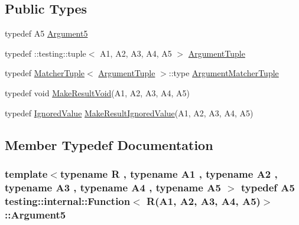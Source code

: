 \subsection*{Public Types}
\begin{DoxyCompactItemize}
\item 
typedef A5 \hyperlink{structtesting_1_1internal_1_1Function_3_01R_07A1_00_01A2_00_01A3_00_01A4_00_01A5_08_4_a5bc0279c43aa98c409219dee1b815c71}{Argument5}
\item 
typedef \+::testing\+::tuple$<$ A1, A2, A3, A4, A5 $>$ \hyperlink{structtesting_1_1internal_1_1Function_3_01R_07A1_00_01A2_00_01A3_00_01A4_00_01A5_08_4_af5a1487829347eae2a48b2f66f216f52}{Argument\+Tuple}
\item 
typedef \hyperlink{structtesting_1_1internal_1_1MatcherTuple}{Matcher\+Tuple}$<$ \hyperlink{structtesting_1_1internal_1_1Function_3_01R_07_08_4_ad483c3128c470d8cdb55c3ac1c575c11}{Argument\+Tuple} $>$\+::type \hyperlink{structtesting_1_1internal_1_1Function_3_01R_07A1_00_01A2_00_01A3_00_01A4_00_01A5_08_4_a03c18380538e53141227afe6d0f20cc8}{Argument\+Matcher\+Tuple}
\item 
typedef void \hyperlink{structtesting_1_1internal_1_1Function_3_01R_07A1_00_01A2_00_01A3_00_01A4_00_01A5_08_4_a2903acde18de33d756eef4d43d843c04}{Make\+Result\+Void}(A1, A2, A3, A4, A5)
\item 
typedef \hyperlink{classtesting_1_1internal_1_1IgnoredValue}{Ignored\+Value} \hyperlink{structtesting_1_1internal_1_1Function_3_01R_07A1_00_01A2_00_01A3_00_01A4_00_01A5_08_4_a552ce4ec27e2d09fa1c133c66f72d7b3}{Make\+Result\+Ignored\+Value}(A1, A2, A3, A4, A5)
\end{DoxyCompactItemize}


\subsection{Member Typedef Documentation}
\subsubsection[{\texorpdfstring{Argument5}{Argument5}}]{\setlength{\rightskip}{0pt plus 5cm}template$<$typename R , typename A1 , typename A2 , typename A3 , typename A4 , typename A5 $>$ typedef A5 {\bf testing\+::internal\+::\+Function}$<$ R(A1, A2, A3, A4, A5)$>$\+::{\bf Argument5}}\hypertarget{structtesting_1_1internal_1_1Function_3_01R_07A1_00_01A2_00_01A3_00_01A4_00_01A5_08_4_a5bc0279c43aa98c409219dee1b815c71}{}\label{structtesting_1_1internal_1_1Function_3_01R_07A1_00_01A2_00_01A3_00_01A4_00_01A5_08_4_a5bc0279c43aa98c409219dee1b815c71}
